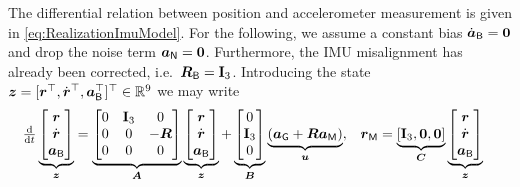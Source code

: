 The differential relation between position and accelerometer measurement is given in \eqref{eq:RealizationImuModel}. 
For the following, we assume a constant bias $\aIMUBd = \tuple{0}$ and drop the noise term $\aIMUN = \tuple{0}$.
Furthermore, the IMU misalignment has already been corrected, i.e.\ $\RIMUBR = \idMat[3]$.
Introducing the state $\tuple{z} = [\r^\top, \rd^\top, \aIMUB^\top]^\top \in \RealNum^9$ we may write 
\begin{align}\label{eq:AccelerometerDynamicsState}
 \tdiff{t}
 \underbrace{\begin{bmatrix} \r \\ \rd \\ \aIMUB \end{bmatrix}}_{\tuple{z}}
 &=
 \underbrace{\begin{bmatrix} 0 & \idMat[3] & 0 \\ 0 & 0 & -\R \\ 0 & 0 & 0 \end{bmatrix}}_{\mat{A}}
 \underbrace{\begin{bmatrix} \r \\ \rd \\ \aIMUB \end{bmatrix}}_{\tuple{z}}
 +
 \underbrace{\begin{bmatrix} 0 \\ \idMat[3] \\ 0 \end{bmatrix}}_{\mat{B}}
 \underbrace{(\gravityAcc + \R \aIMU)}_{\tuple{u}},&
 \rVIC &= \underbrace{[\idMat[3], \mat{0}, \mat{0}]}_{\mat{C}}
 \underbrace{\begin{bmatrix} \r \\ \rd \\ \aIMUB \end{bmatrix}}_{\tuple{z}}
\end{align}

